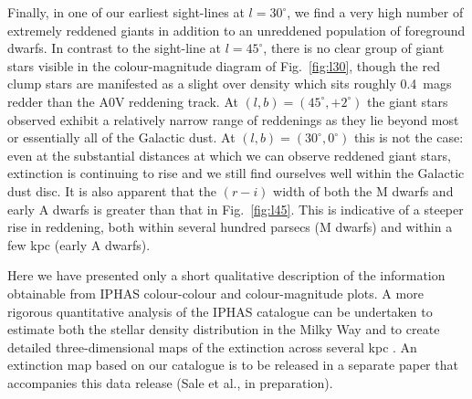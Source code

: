 \documentclass[useAMS,usenatbib]{mn2e}
\begin{document}
Finally, in one of our earliest sight-lines at $l=30^{\circ}$,
we find a very high number of extremely reddened giants
in addition to an unreddened population
of foreground dwarfs.
In contrast to the sight-line at $l=45^{\circ}$,
there is no clear group of giant stars visible
in the colour-magnitude diagram of Fig.~\ref{fig:l30},
though the red clump stars are manifested as a slight over density
which sits roughly 0.4~mags redder than the A0V reddening track.
At $(l,b)=(45^{\circ}, +2^{\circ})$ the giant stars observed
exhibit a relatively narrow range of reddenings
as they lie beyond most or essentially all of the Galactic dust.
At $(l,b)=(30^{\circ}, 0^{\circ})$ this is not the case:
even at the substantial distances
at which we can observe reddened giant stars,
extinction is continuing to rise
and we still find ourselves well within the Galactic dust disc.
It is also apparent that the $(r-i)$ width of both the M dwarfs
and early A dwarfs is greater than that in Fig.~\ref{fig:l45}.
This is indicative of a steeper rise in reddening,
both within several hundred parsecs (M dwarfs)
and within a few kpc (early A dwarfs).

Here we have presented only a short qualitative description
of the information obtainable
from IPHAS colour-colour and colour-magnitude plots.
A more rigorous quantitative analysis of the IPHAS catalogue
can be undertaken to estimate both
the stellar density distribution in the Milky Way \citep{Sale2010}
and to create detailed three-dimensional maps
of the extinction across several kpc \citep{Sale2009,Sale2012}.
An extinction map based on our catalogue
is to be released in a separate paper
that accompanies this data release (Sale et al., in preparation).
\end{document}

